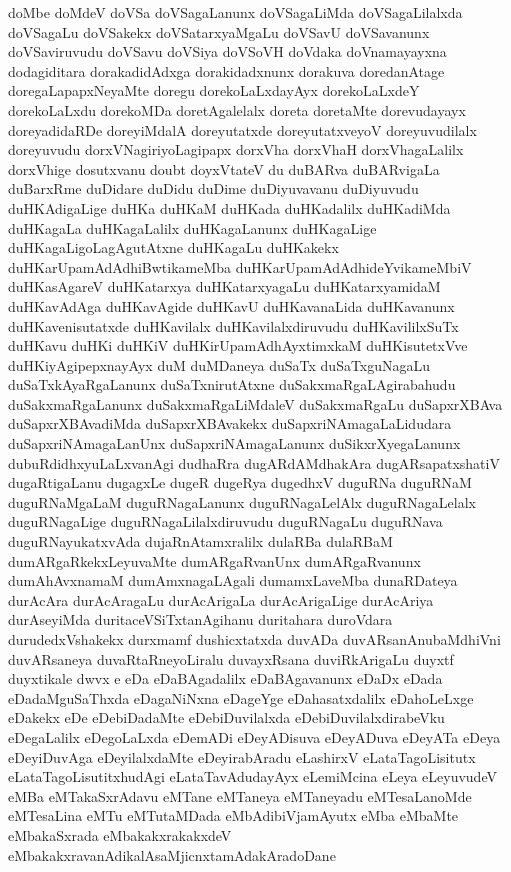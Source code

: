{doMbe
doMdeV
doVSa
doVSagaLanunx
doVSagaLiMda
doVSagaLilalxda
doVSagaLu
doVSakekx
doVSatarxyaMgaLu
doVSavU
doVSavanunx
doVSaviruvudu
doVSavu
doVSiya
doVSoVH
doVdaka
doVnamayayxna
dodagiditara
dorakadidAdxga
dorakidadxnunx
dorakuva
doredanAtage
doregaLapapxNeyaMte
doregu
dorekoLaLxdayAyx
dorekoLaLxdeY
dorekoLaLxdu
dorekoMDa
doretAgalelalx
doreta
doretaMte
dorevudayayx
doreyadidaRDe
doreyiMdalA
doreyutatxde
doreyutatxveyoV
doreyuvudilalx
doreyuvudu
dorxVNagiriyoLagipapx
dorxVha
dorxVhaH
dorxVhagaLalilx
dorxVhige
dosutxvanu
doubt
doyxVtateV
du
duBARva
duBARvigaLa
duBarxRme
duDidare
duDidu
duDime
duDiyuvavanu
duDiyuvudu
duHKAdigaLige
duHKa
duHKaM
duHKada
duHKadalilx
duHKadiMda
duHKagaLa
duHKagaLalilx
duHKagaLanunx
duHKagaLige
duHKagaLigoLagAgutAtxne
duHKagaLu
duHKakekx
duHKarUpamAdAdhiBwtikameMba
duHKarUpamAdAdhideYvikameMbiV
duHKasAgareV
duHKatarxya
duHKatarxyagaLu
duHKatarxyamidaM
duHKavAdAga
duHKavAgide
duHKavU
duHKavanaLida
duHKavanunx
duHKavenisutatxde
duHKavilalx
duHKavilalxdiruvudu
duHKavililxSuTx
duHKavu
duHKi
duHKiV
duHKirUpamAdhAyxtimxkaM
duHKisutetxVve
duHKiyAgipepxnayAyx
duM
duMDaneya
duSaTx
duSaTxguNagaLu
duSaTxkAyaRgaLanunx
duSaTxnirutAtxne
duSakxmaRgaLAgirabahudu
duSakxmaRgaLanunx
duSakxmaRgaLiMdaleV
duSakxmaRgaLu
duSapxrXBAva
duSapxrXBAvadiMda
duSapxrXBAvakekx
duSapxriNAmagaLaLidudara
duSapxriNAmagaLanUnx
duSapxriNAmagaLanunx
duSikxrXyegaLanunx
dubuRdidhxyuLaLxvanAgi
dudhaRra
dugARdAMdhakAra
dugARsapatxshatiV
dugaRtigaLanu
dugagxLe
dugeR
dugeRya
dugedhxV
duguRNa
duguRNaM
duguRNaMgaLaM
duguRNagaLanunx
duguRNagaLelAlx
duguRNagaLelalx
duguRNagaLige
duguRNagaLilalxdiruvudu
duguRNagaLu
duguRNava
duguRNayukatxvAda
dujaRnAtamxralilx
dulaRBa
dulaRBaM
dumARgaRkekxLeyuvaMte
dumARgaRvanUnx
dumARgaRvanunx
dumAhAvxnamaM
dumAmxnagaLAgali
dumamxLaveMba
dunaRDateya
durAcAra
durAcAragaLu
durAcArigaLa
durAcArigaLige
durAcAriya
durAseyiMda
duritaceVSiTxtanAgihanu
duritahara
duroVdara
durudedxVshakekx
durxmamf
dushicxtatxda
duvADa
duvARsanAnubaMdhiVni
duvARsaneya
duvaRtaRneyoLiralu
duvayxRsana
duviRkArigaLu
duyxtf
duyxtikale
dwvx
e
eDa
eDaBAgadalilx
eDaBAgavanunx
eDaDx
eDada
eDadaMguSaThxda
eDagaNiNxna
eDageYge
eDahasatxdalilx
eDahoLeLxge
eDakekx
eDe
eDebiDadaMte
eDebiDuvilalxda
eDebiDuvilalxdirabeVku
eDegaLalilx
eDegoLaLxda
eDemADi
eDeyADisuva
eDeyADuva
eDeyATa
eDeya
eDeyiDuvAga
eDeyilalxdaMte
eDeyirabAradu
eLashirxV
eLataTagoLisitutx
eLataTagoLisutitxhudAgi
eLataTavAdudayAyx
eLemiMcina
eLeya
eLeyuvudeV
eMBa
eMTakaSxrAdavu
eMTane
eMTaneya
eMTaneyadu
eMTesaLanoMde
eMTesaLina
eMTu
eMTutaMDada
eMbAdibiVjamAyutx
eMba
eMbaMte
eMbakaSxrada
eMbakakxrakakxdeV
eMbakakxravanAdikalAsaMjicnxtamAdakAradoDane
}
